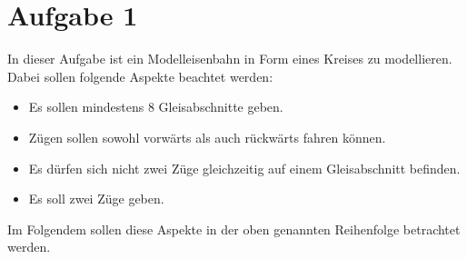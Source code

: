 \documentclass[10pt]{scrartcl}
\author{Carsten Noetzel, Armin Steudte}
\title{\titletext}
\date{23.03.2012}
\begin{document}
\maketitle

\setcounter{tocdepth}{3}
\tableofcontents
\listoffigures

\section{Aufgabe 1}
In dieser Aufgabe ist ein Modelleisenbahn in Form eines Kreises zu modellieren.
Dabei sollen folgende Aspekte beachtet werden:
\begin{itemize}
	\item Es sollen mindestens 8 Gleisabschnitte geben.
	\item Zügen sollen sowohl vorwärts als auch rückwärts fahren können.
	\item Es dürfen sich nicht zwei Züge gleichzeitig auf einem Gleisabschnitt befinden.
	\item Es soll zwei Züge geben.
\end{itemize}
Im Folgendem sollen diese Aspekte in der oben genannten Reihenfolge betrachtet werden.
\end{document}
